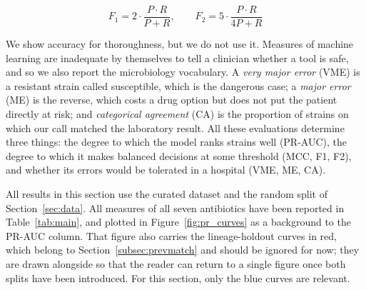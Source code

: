 \begin{equation}
F_1 = 2 \cdot \frac{P \cdot R}{P + R},
\qquad
F_2 = 5 \cdot \frac{P \cdot R}{4P + R}
\end{equation}

We show accuracy for thoroughness, but we do not use it. Measures of machine
learning are inadequate by themselves to tell a clinician whether a tool is
safe, and so we also report the microbiology vocabulary. A \emph{very major
error} (VME) is a resistant strain called susceptible, which is the
dangerous case; a \emph{major error} (ME) is the reverse, which costs a drug
option but does not put the patient directly at risk; and \emph{categorical
agreement} (CA) is the proportion of strains on which our call matched
the laboratory result. All these evaluations determine three
things: the degree to which the model ranks strains well (PR-AUC), the degree
to which it makes balanced decisions at some threshold (MCC, F1, F2), and
whether its errors would be tolerated in a hospital (VME, ME, CA).

\vspace{1em}

All results in this section use the curated dataset and the random split of
Section~\ref{sec:data}. All measures of all seven antibiotics have been
reported in Table~\ref{tab:main}, and plotted in Figure~\ref{fig:pr_curves} as
a background to the PR-AUC column. That figure also carries the lineage-holdout
curves in red, which belong to Section~\ref{subsec:prevmatch} and should be
ignored for now; they are drawn alongside so that the reader can return to a
single figure once both splits have been introduced. For this section, only the
blue curves are relevant.

